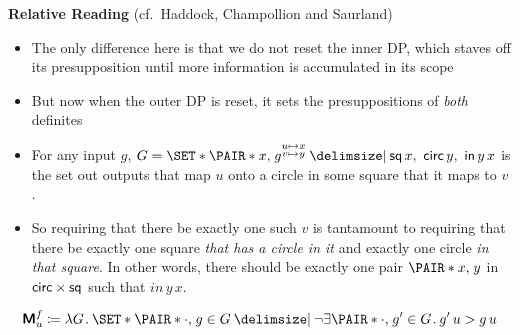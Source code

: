 \documentclass[10pt,fleqn]{article}
\newcommand{\M}{\text{\sffamily\bfseries M}}
\begin{document}
\begin{minipage}[t]{0.4\textwidth}
  \textbf{Relative Reading} (cf.\ Haddock, Champollion and Saurland)

  \begin{itemize}
    \item
      The only difference here is that we do not reset the inner DP, which
      staves off its presupposition until more information is accumulated in
      its scope
    \item
      But now when the outer DP is reset, it sets the presuppositions
      of \emph{both} definites
    \item
      For any input $g$, $G =
      \set{\pair{x}{g^{\substack{u\mapsto x\\ v\mapsto y}}} \giv \cn{sq}\,x,\
        \cn{circ}\,y,\ \cn{in}\,y\,x}$ is the set out outputs that map $u$
        onto a circle in some square that it maps to $v$.
    \item
      So requiring that there be exactly one such $v$ is tantamount to
      requiring that there be exactly one square \emph{that has a circle in
      it} and exactly one circle \emph{in that square}. In other words, there
      should be exactly one pair $\pair{x}{y}$ in ${\sf circ} \times {\sf sq}$
      such that $in\,y\,x$.
  \end{itemize}
\end{minipage}

\newpage

\begin{minipage}[t]{0.6\textwidth}
\begin{spreadlines}{0pt}
\begin{align*}
  \M_u^f &\coloneq
  \l G \dt
    \set{%
      \pair{\cdot}{g} \in G
    \giv
      \neg\exists\pair{\cdot}{g'} \in G \dt g'\,u > g\,u
    } \\
\end{align*}  
\end{spreadlines}
\end{minipage}

\newpage
\end{document}
